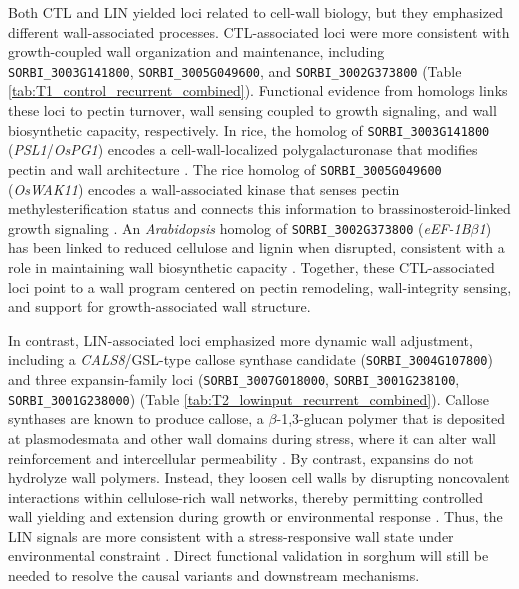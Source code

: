 \documentclass[9pt,twocolumn,twoside]{rilabRxiv}
\begin{document}
Both CTL and LIN yielded loci related to cell-wall biology, but they emphasized different wall-associated processes. CTL-associated loci were more consistent with growth-coupled wall organization and maintenance, including \texttt{SORBI\_3003G141800}, \texttt{SORBI\_3005G049600}, and \texttt{SORBI\_3002G373800} (Table \ref{tab:T1_control_recurrent_combined}). Functional evidence from homologs links these loci to pectin turnover, wall sensing coupled to growth signaling, and wall biosynthetic capacity, respectively. In rice, the homolog of \texttt{SORBI\_3003G141800} (\textit{PSL1}/\textit{OsPG1}) encodes a cell-wall-localized polygalacturonase that modifies pectin and wall architecture \citep{Zhang2021PSL1}. The rice homolog of \texttt{SORBI\_3005G049600} (\textit{OsWAK11}) encodes a wall-associated kinase that senses pectin methylesterification status and connects this information to brassinosteroid-linked growth signaling \citep{Yue2022OsWAK11}. An \textit{Arabidopsis} homolog of \texttt{SORBI\_3002G373800} (\textit{eEF-1B$\beta$1}) has been linked to reduced cellulose and lignin when disrupted, consistent with a role in maintaining wall biosynthetic capacity \citep{Hossain2012EF1Bb1}. Together, these CTL-associated loci point to a wall program centered on pectin remodeling, wall-integrity sensing, and support for growth-associated wall structure.

In contrast, LIN-associated loci emphasized more dynamic wall adjustment, including a \textit{CALS8}/GSL-type callose synthase candidate (\texttt{SORBI\_3004G107800}) and three expansin-family loci (\texttt{SORBI\_3007G018000}, \texttt{SORBI\_3001G238100}, \texttt{SORBI\_3001G238000}) \citep{Gladman2022SorghumBase} (Table \ref{tab:T2_lowinput_recurrent_combined}). Callose synthases are known to produce callose, a $\beta$-1,3-glucan polymer that is deposited at plasmodesmata and other wall domains during stress, where it can alter wall reinforcement and intercellular permeability \citep{CuiLee2016}. By contrast, expansins do not hydrolyze wall polymers. Instead, they loosen cell walls by disrupting noncovalent interactions within cellulose-rich wall networks, thereby permitting controlled wall yielding and extension during growth or environmental response \citep{McQueenMason1992,Cosgrove2024}. Thus, the LIN signals are more consistent with a stress-responsive wall state under environmental constraint \citep{Ma2013}. Direct functional validation in sorghum will still be needed to resolve the causal variants and downstream mechanisms.
\end{document}
